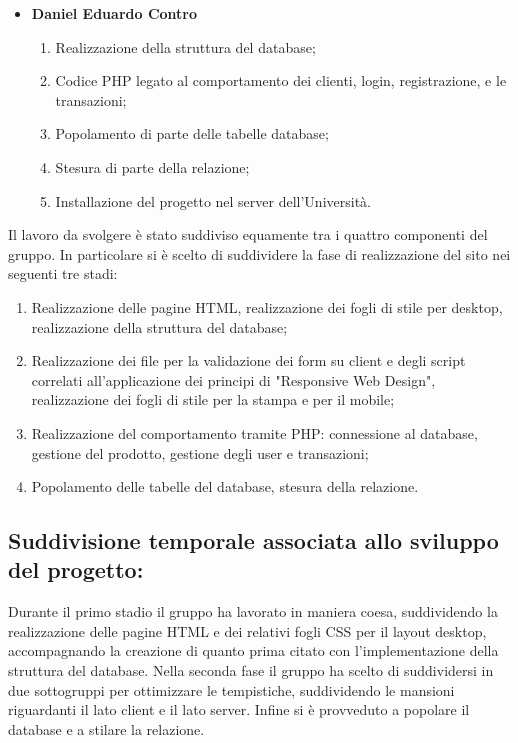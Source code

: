 \begin{itemize}
\begin{enumerate}
    \end{enumerate}
     \item \textbf{Daniel Eduardo Contro} \begin{enumerate}
        \item Realizzazione della struttura del database;
        \item Codice PHP legato al comportamento dei clienti, login, registrazione, e le transazioni;
        \item Popolamento di parte delle tabelle database;
        \item Stesura di parte della relazione;
        \item Installazione del progetto nel server dell'Università.
    \end{enumerate}
\end{itemize}

Il lavoro da svolgere è stato suddiviso equamente tra i quattro componenti del gruppo. In particolare si è scelto di suddividere la fase di realizzazione del sito nei seguenti tre stadi:
\begin{enumerate}
    \item Realizzazione delle pagine HTML, realizzazione dei fogli di stile per desktop, realizzazione della struttura del database;
    \item Realizzazione dei file per la validazione dei form su client e degli script correlati all'applicazione dei principi di "Responsive Web Design", realizzazione dei fogli di stile per la stampa e per il mobile;
    \item Realizzazione del comportamento tramite PHP: connessione al database, gestione del prodotto, gestione degli user e transazioni;
    \item Popolamento delle tabelle del database, stesura della relazione.
\end{enumerate}

\subsection{Suddivisione temporale associata allo sviluppo del progetto:}
Durante il primo stadio il gruppo ha lavorato in maniera coesa, suddividendo la realizzazione delle pagine HTML e dei relativi fogli CSS per il layout desktop, accompagnando la creazione di quanto prima citato con l'implementazione della struttura del database. Nella seconda fase il gruppo ha scelto di suddividersi in due sottogruppi per ottimizzare le tempistiche, suddividendo le mansioni riguardanti il lato client e il lato server. Infine si è provveduto a popolare il database e a stilare la relazione.
